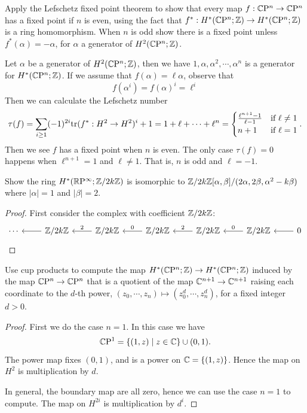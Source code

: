 \begin{exercise}
Apply the Lefschetz fixed point theorem to show that every map $f:\mathbb{C}\mathrm{P}^n\to\mathbb{C}\mathrm{P}^n$ has a fixed point if $n$ is even, using the fact that $f^*:H^*(\mathbb{C}\mathrm{P}^n;\mathbb{Z})\to H^*(\mathbb{C}\mathrm{P}^n;\mathbb{Z})$ is a ring homomorphism. When $n$ is odd show there is a fixed point unless $f^*(\alpha)=-\alpha$, for $\alpha$ a generator of $H^2(\mathbb{C}\mathrm{P}^n;\mathbb{Z})$.
\end{exercise}
\begin{exercise}
Let $\alpha$ be a generator of $H^2(\mathbb{C}\mathrm{P}^n;\mathbb{Z})$, then we have $1,\alpha,\alpha^2,\cdots,\alpha^n$ is a generator for $H^*(\mathbb{C}\mathrm{P}^n;\mathbb{Z})$. If we assume that $f(\alpha)=\ell\alpha$, observe that 
\[f(\alpha^i)=f(\alpha)^i=\ell^i\]
Then we can calculate the Lefschetz number
\[\tau(f)=\sum_{i\geq 1}(-1)^{2i}\mathrm{tr}(f^*:H^2\to H^2)^i+1=1+\ell+\cdots+\ell^{n}=\begin{cases}
\frac{\ell^{n+1}-1}{\ell-1}&\text{if }\ell\neq 1\\
n+1&\text{if }\ell=1
\end{cases}.\]
Then we see $f$ has a fixed point when $n$ is even. The only case $\tau(f)=0$ happens when $\ell^{n+1}=1$ and $\ell\neq 1$. That is, $n$ is odd and $\ell=-1$.
\end{exercise}
\begin{exercise}
Show the ring $H^*(\mathbb{R}\mathrm{P}^\infty;\mathbb{Z}/2k\mathbb{Z})$ is isomorphic to $\mathbb{Z}/2k\mathbb{Z}[\alpha,\beta]/(2\alpha,2\beta,\alpha^2-k\beta)$ where $|\alpha|=1$ and $|\beta|=2$.
\end{exercise}
\begin{proof}
First consider the complex with coefficient $\mathbb{Z}/2k\mathbb{Z}$:
\[\begin{tikzcd}
\cdots&\Z/2k\Z\ar[l]&\Z/2k\Z\ar[l,swap,"2"]&\Z/2k\Z\ar[l,swap,"0"]&\Z/2k\Z\ar[l,swap,"2"]&\Z/2k\Z\ar[l,swap,"0"]&0\ar[l]
\end{tikzcd}\]
\end{proof}
\begin{exercise}
Use cup products to compute the map $H^*(\mathbb{C}\mathrm{P}^n;\mathbb{Z})\to H^*(\mathbb{C}\mathrm{P}^n;\mathbb{Z})$ induced by the map $\mathbb{C}\mathrm{P}^n\to\mathbb{C}\mathrm{P}^n$ that is a quotient of the map $\mathbb{C}^{n+1}\to\mathbb{C}^{n+1}$ raising each coordinate to the $d$-th power, $(z_0,\cdots,z_n)\mapsto (z_0^d,\cdots,z_n^d)$, for a fixed integer $d>0$.
\end{exercise} 
\begin{proof}
First we do the case $n=1$. In this case we have
\[\mathbb{C}\mathrm{P}^1=\{(1,z)\mid z\in \mathbb{C}\}\cup(0,1).\]
The power map fixes $(0,1)$, and is a power on $\mathbb{C}=\{(1,z)\}$. Hence the map on $H^2$ is multiplication by $d$.\par
In general, the boundary map are all zero, hence we can use the case $n=1$ to compute. The map on $H^{2i}$ is multiplication by $d^i$.
\end{proof}
